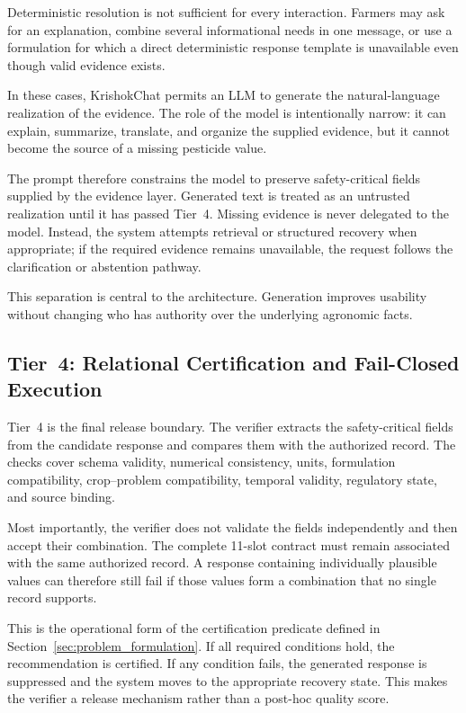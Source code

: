\documentclass[a4paper,fleqn]{cas-dc}
\begin{document}
Deterministic resolution is not sufficient for every interaction. Farmers may ask for an explanation, combine several informational needs in one message, or use a formulation for which a direct deterministic response template is unavailable even though valid evidence exists.

In these cases, KrishokChat permits an LLM to generate the natural-language realization of the evidence. The role of the model is intentionally narrow: it can explain, summarize, translate, and organize the supplied evidence, but it cannot become the source of a missing pesticide value.

The prompt therefore constrains the model to preserve safety-critical fields supplied by the evidence layer. Generated text is treated as an untrusted realization until it has passed Tier~4. Missing evidence is never delegated to the model. Instead, the system attempts retrieval or structured recovery when appropriate; if the required evidence remains unavailable, the request follows the clarification or abstention pathway.

This separation is central to the architecture. Generation improves usability without changing who has authority over the underlying agronomic facts.

\subsection{Tier~4: Relational Certification and Fail-Closed Execution}

Tier~4 is the final release boundary. The verifier extracts the safety-critical fields from the candidate response and compares them with the authorized record. The checks cover schema validity, numerical consistency, units, formulation compatibility, crop--problem compatibility, temporal validity, regulatory state, and source binding.

Most importantly, the verifier does not validate the fields independently and then accept their combination. The complete 11-slot contract must remain associated with the same authorized record. A response containing individually plausible values can therefore still fail if those values form a combination that no single record supports.

This is the operational form of the certification predicate defined in Section~\ref{sec:problem_formulation}. If all required conditions hold, the recommendation is certified. If any condition fails, the generated response is suppressed and the system moves to the appropriate recovery state. This makes the verifier a release mechanism rather than a post-hoc quality score.
\end{document}

